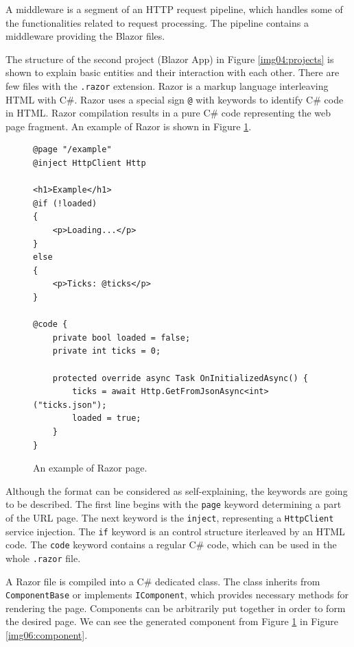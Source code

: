 A middleware is a segment of an HTTP request pipeline, which handles some of the functionalities related to request processing.
The pipeline contains a middleware providing the Blazor files.
\par
The structure of the second project (Blazor App) in Figure \ref{img04:projects} is shown to explain basic entities and their interaction with each other.
There are few files with the \texttt{.razor} extension.
Razor is a markup language interleaving HTML with C\#.
Razor uses a special sign \texttt{@} with keywords to identify C\# code in HTML.
Razor compilation results in a pure C\# code representing the web page fragment.
An example of Razor is shown in Figure \ref{img05:razor}.
\par
\begin{figure}
\begin{lstlisting}
@page "/example"
@inject HttpClient Http

<h1>Example</h1>
@if (!loaded)
{
    <p>Loading...</p>
}
else
{
    <p>Ticks: @ticks</p>
}

@code {
    private bool loaded = false;
    private int ticks = 0;

    protected override async Task OnInitializedAsync() {
        ticks = await Http.GetFromJsonAsync<int>("ticks.json");
        loaded = true;
    }
}
\end{lstlisting}
\caption{An example of Razor page.}
\label{img05:razor}
\end{figure}
\par
Although the format can be considered as self-explaining, the keywords are going to be described.
The first line begins with the \texttt{page} keyword determining a part of the URL page.
The next keyword is the \texttt{inject}, representing a \texttt{HttpClient} service injection. 
The \texttt{if} keyword is an control structure iterleaved by an HTML code.
The \texttt{code} keyword contains a regular C\# code, which can be used in the whole \texttt{.razor} file.
\par
A Razor file is compiled into a C\# dedicated class.
The class inherits from \texttt{ComponentBase} or implements \texttt{IComponent}, which provides necessary methods for rendering the page.
Components can be arbitrarily put together in order to form the desired page.
We can see the generated component from Figure \ref{img05:razor} in Figure \ref{img06:component}.
\par
